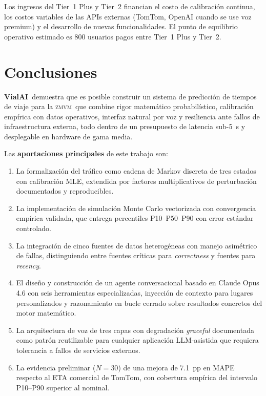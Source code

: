 \documentclass[11pt,a4paper]{article}
\newcommand{\VialAI}{\textbf{\textcolor{vialTeal}{Vial}\textcolor{vialAmber}{AI}}}
\newcommand{\ZMVM}{\textsc{zmvm}}
\begin{document}
Los ingresos del Tier~1 Plus y Tier~2 financian el costo de
calibración continua, los costos variables de las APIs externas
(TomTom, OpenAI cuando se use voz premium) y el desarrollo de
nuevas funcionalidades. El punto de equilibrio operativo
estimado es \num{800} usuarios pagos entre Tier~1 Plus y Tier~2.

\section{Conclusiones}
\label{sec:conclusiones}

\VialAI\ demuestra que es posible construir un sistema de
predicción de tiempos de viaje para la \ZMVM\ que combine rigor
matemático probabilístico, calibración empírica con datos
operativos, interfaz natural por voz y resiliencia ante fallos
de infraestructura externa, todo dentro de un presupuesto de
latencia sub-\SI{5}{s} y desplegable en hardware de gama media.

Las \textbf{aportaciones principales} de este trabajo son:

\begin{enumerate}
\item La formalización del tráfico como cadena de Markov discreta
de tres estados con calibración MLE, extendida por factores
multiplicativos de perturbación documentados y reproducibles.
\item La implementación de simulación Monte Carlo vectorizada
con convergencia empírica validada, que entrega percentiles
P10--P50--P90 con error estándar controlado.
\item La integración de cinco fuentes de datos heterogéneas con
manejo asimétrico de fallas, distinguiendo entre fuentes
críticas para \emph{correctness} y fuentes para \emph{recency}.
\item El diseño y construcción de un agente conversacional
basado en Claude Opus 4.6 con seis herramientas especializadas,
inyección de contexto para lugares personalizados y razonamiento
en bucle cerrado sobre resultados concretos del motor matemático.
\item La arquitectura de voz de tres capas con degradación
\emph{graceful} documentada como patrón reutilizable para
cualquier aplicación LLM-asistida que requiera tolerancia a
fallos de servicios externos.
\item La evidencia preliminar ($N=\num{30}$) de una mejora de
\SI{7.1}{pp} en MAPE respecto al ETA comercial de TomTom, con
cobertura empírica del intervalo P10--P90 superior al nominal.
\end{enumerate}
\end{document}

